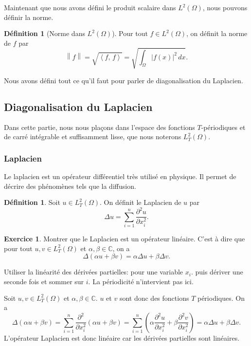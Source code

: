 \documentclass[11pt,a4paper]{article}
\numberwithin{equation}{section}
\theoremstyle{plain}
\theoremstyle{definition}
\newtheorem{definition}[theorem]{Définition}
\newtheorem{exercise}[theorem]{Exercice}
\theoremstyle{remark}
\newcommand{\C}{\mathbb{C}}
\newcommand{\norm}[1]{\left\lVert #1\right\rVert}
\newcommand{\ip}[2]{\left\langle #1,\, #2\right\rangle}
\newcommand{\Lap}{\Delta}
\begin{document}
Maintenant que nous avons défini le produit scalaire dans $L^2(\Omega)$, nous pouvons définir la norme.

\begin{definition}[Norme dans $L^2(\Omega)$]
Pour tout $f \in L^2(\Omega)$, on définit la norme de $f$ par
\[
    \norm{f} = \sqrt{\ip{f}{f}} = \sqrt{\int_\Omega |f(x)|^2 \, dx}.
\]
\end{definition}

Nous avons défini tout ce qu'il faut pour parler de diagonalisation du Laplacien.

\subsection{Diagonalisation du Laplacien}

Dans cette partie, nous nous plaçons dans l'espace des fonctions $T$-périodiques et de carré intégrable et suffisamment lisse, que nous noterons $L^2_T(\Omega)$.

\subsubsection{Laplacien}

Le laplacien est un opérateur différentiel très utilisé en physique. Il permet de décrire des phénomènes tels que la diffusion.

\begin{definition}
    Soit $u \in L^2_T(\Omega)$. On définit le Laplacien de $u$ par
    \[
        \Lap u = \sum_{i=1}^n \frac{\partial^2 u}{\partial x_i^2}.
    \]
\end{definition}

\begin{exercise}
    Montrer que le Laplacien est un opérateur linéaire.
    C'est à dire que pour tout $u,v \in L^2_T(\Omega)$ et $\alpha,\beta \in \C$, on a
    \[
        \Lap(\alpha u + \beta v) = \alpha \Lap u + \beta \Lap v.
    \]
\end{exercise}

\begin{indication}
    Utiliser la linéarité des dérivées partielles: pour une variable $x_i$.
    puis dériver une seconde fois et sommer sur $i$.
    La périodicité n'intervient pas ici.
\end{indication}

\begin{solution}
    Soit $u,v \in L^2_T(\Omega)$ et $\alpha,\beta \in \C$. $u$ et $v$ sont donc des fonctions $T$ périodiques. On a
    \[
        \Lap(\alpha u + \beta v) = \sum_{i=1}^n \frac{\partial^2}{\partial x_i^2}(\alpha u + \beta v) = \sum_{i=1}^n \left( \alpha \frac{\partial^2 u}{\partial x_i^2} + \beta \frac{\partial^2 v}{\partial x_i^2} \right) = \alpha \Lap u + \beta \Lap v.
    \]
    L'opérateur Laplacien est donc linéaire car les dérivées partielles sont linéaires.
\end{solution}
\end{document}
